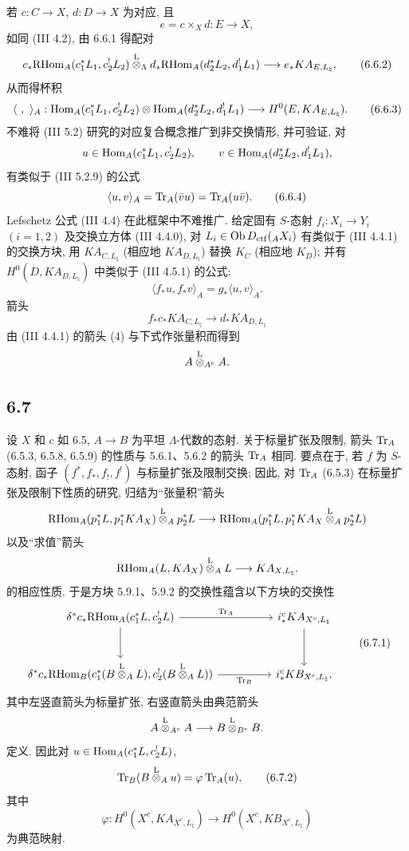 若 $c:C\to X$, $d:D\to X$ 为对应, 且
\[
e=c\times_Xd:E\to X,
\]
如同 (III 4.2), 由 6.6.1 得配对
\begin{equation}
c_*\mathrm{RHom}_A(c_1^*L_1,c_2^!L_2)
\overset{\mathrm L}{\otimes}_{\Lambda}
d_*\mathrm{RHom}_A(d_2^*L_2,d_1^!L_1)
\longrightarrow
e_*KA_{E,L_{\natural}},
\tag{6.6.2}
\end{equation}
从而得杯积
\begin{equation}
\langle\ ,\ \rangle_A:
\Hom_A(c_1^*L_1,c_2^!L_2)\otimes
\Hom_A(d_2^*L_2,d_1^!L_1)
\longrightarrow
H^0(E,KA_{E,L_{\natural}}).
\tag{6.6.3}
\end{equation}
不难将 (III 5.2) 研究的对应复合概念推广到非交换情形, 并可验证, 对
\[
u\in\operatorname{Hom}_A(c_1^*L_1,c_2^!L_2),\qquad
v\in\operatorname{Hom}_A(d_2^*L_2,d_1^!L_1),
\]
有类似于 (III 5.2.9) 的公式
\begin{equation}
\langle u,v\rangle_A=\operatorname{Tr}_A(\bar vu)=\operatorname{Tr}_A(u\bar v).
\tag{6.6.4}
\end{equation}
Lefschetz 公式 (III 4.4) 在此框架中不难推广. 给定固有 $S$-态射 $f_i:X_i\to Y_i$ $(i=1,2)$ 及交换立方体 (III 4.4.0), 对 $L_i\in\operatorname{Ob} D_{\mathrm{ctf}}({}_AX_i)$ 有类似于 (III 4.4.1) 的交换方块, 用 $KA_{C,L_{\natural}}$ (相应地 $KA_{D,L_{\natural}}$) 替换 $K_C$ (相应地 $K_D$); 并有 $H^0(D,KA_{D,L_{\natural}})$ 中类似于 (III 4.5.1) 的公式:
\begin{equation}
\langle f_*u,f_*v\rangle_A=g_*\langle u,v\rangle_A.
\tag{6.6.5}
\end{equation}
箭头
\[
f_*c_*KA_{C,L_{\natural}}\longrightarrow d_*KA_{D,L_{\natural}}
\]
由 (III 4.4.1) 的箭头 (4) 与下式作张量积而得到
\[
A\overset{\mathrm L}{\otimes}_{A^e}A .
\]

\subsection*{6.7}
设 $X$ 和 $c$ 如 6.5, $A\to B$ 为平坦 $\Lambda$-代数的态射. 关于标量扩张及限制, 箭头 $\operatorname{Tr}_A$ (6.5.3, 6.5.8, 6.5.9) 的性质与 5.6.1、5.6.2 的箭头 $\operatorname{Tr}_A$ 相同. 要点在于, 若 $f$ 为 $S$-态射, 函子 $(f^*,f_*,f_!,f^!)$ 与标量扩张及限制交换; 因此, 对 $\operatorname{Tr}_A$ (6.5.3) 在标量扩张及限制下性质的研究, 归结为``张量积''箭头
\[
\mathrm{RHom}_A(p_1^*L,p_1^*KA_X)\overset{\mathrm L}{\otimes}_Ap_2^*L
\longrightarrow
\mathrm{RHom}_A(p_1^*L,p_1^*KA_X\overset{\mathrm L}{\otimes}_Ap_2^*L)
\]
以及``求值''箭头
\[
\mathrm{RHom}_A(L,KA_X)\overset{\mathrm L}{\otimes}_A L\longrightarrow KA_{X,L_{\natural}}.
\]
的相应性质. 于是方块 5.9.1、5.9.2 的交换性蕴含以下方块的交换性
\begin{equation}
\begin{tikzcd}[column sep=huge,row sep=large]
\delta^*c_*\RHom_A(c_1^*L,c_2^!L) \arrow[r,"\Tr_A"] \arrow[d]
& i_*^cKA_{X^c,L_{\natural}} \arrow[d]\\
\delta^*c_*\RHom_B(c_1^*(B\lten_A L),c_2^!(B\lten_A L)) \arrow[r,"\Tr_B"']
& i_*^cKB_{X^c,L_{\natural}},
\end{tikzcd}
\tag{6.7.1}
\end{equation}
其中左竖直箭头为标量扩张, 右竖直箭头由典范箭头
\[
A\overset{\mathrm L}{\otimes}_{A^e}A\longrightarrow B\overset{\mathrm L}{\otimes}_{B^e}B.
\]
定义. 因此对 $u\in\operatorname{Hom}_A(c_1^*L,c_2^!L)$,
\begin{equation}
\operatorname{Tr}_B(B\overset{\mathrm L}{\otimes}_Au)=\varphi\operatorname{Tr}_A(u),
\tag{6.7.2}
\end{equation}
其中
\[
\varphi:H^0(X^c,KA_{X^c,L_{\natural}})\longrightarrow H^0(X^c,KB_{X^c,L_{\natural}})
\]
为典范映射.

